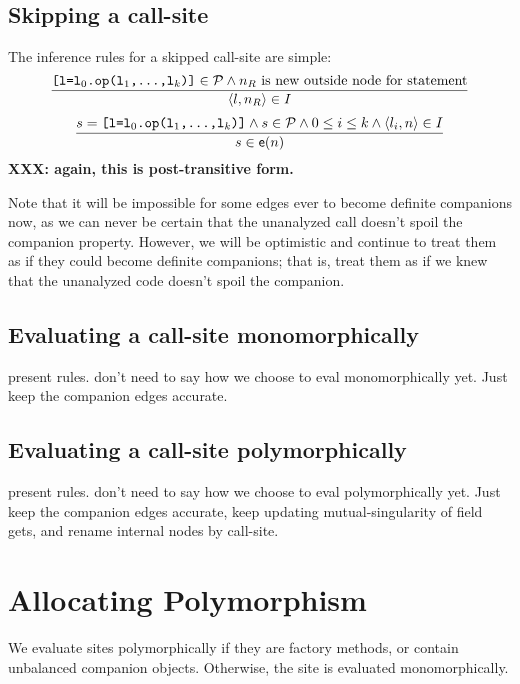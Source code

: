 \documentclass[11pt,notitlepage]{article}
\newcommand{\func}[1]{\ensuremath{\text{\sffamily #1}}}
\begin{document}
\subsection{Skipping a call-site}
The inference rules for a skipped call-site are simple:
\begin{displaymath}
\dfrac
{\text{\tt [l=l$_0$.op(l$_1$,\ldots,l$_k$)]}\in\mathcal{P} \wedge
 n_R \text{ is new outside node for statement} }
{\left\langle l,n_R \right\rangle\in I}
\end{displaymath}
\begin{displaymath}
\dfrac
{s=\text{\tt [l=l$_0$.op(l$_1$,\ldots,l$_k$)]}\wedge s\in\mathcal{P} \wedge
 0\leq i\leq k \wedge
 \tuple{l_i,n}\in I}
{s \in \func{e}(n) }
\end{displaymath}
\textbf{XXX: again, this is post-transitive form.}

Note that it will be impossible for some edges ever to become definite
companions now, as we can never be certain that the unanalyzed call
doesn't spoil the companion property.  However, we will be optimistic
and continue to treat them as if they could become definite
companions; that is, treat them as if we knew that the unanalyzed code
doesn't spoil the companion.

\subsection{Evaluating a call-site monomorphically}

present rules.  don't need to say how we choose to eval
monomorphically yet.  Just keep the companion edges accurate.

\subsection{Evaluating a call-site polymorphically}

present rules.  don't need to say how we choose to eval
polymorphically yet.  Just keep the companion edges accurate,
keep updating mutual-singularity of field gets,
and rename internal nodes by call-site.

\section{Allocating Polymorphism}

We evaluate sites polymorphically if they are factory methods, or
contain unbalanced companion objects.  Otherwise, the site is
evaluated monomorphically.
\end{document}
